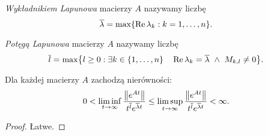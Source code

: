 %
\begin{definition}
  \emph{Wykładnikiem Lapunowa} macierzy $A$ nazywamy liczbę
  \begin{equation*}
    \overline{\lambda} = \max \{ \real \lambda_k : k = 1, \ldots, n \}.
  \end{equation*}
\end{definition}
%
\begin{definition}
  \emph{Potęgą Lapunowa} macierzy $A$ nazywamy liczbę
  \begin{equation*}
    \overline{l} = \max \bigl\{ l \geq 0 : \exists k \in \{1,\ldots,n\} \quad \real \lambda_k = \overline{\lambda} 
    \ \wedge \ M_{k,l} \not= 0 \bigr\}.
  \end{equation*}
\end{definition}
%
\begin{theorem}
  Dla każdej macierzy $A$ zachodzą nierówności:
%
  \begin{equation*}
    0 < \liminf_{t\to\infty} \frac{\norm*{e^{At}}}{t^{\overline{l}} e^{\overline{\lambda} t}} \leq
    \limsup_{t\to\infty} \frac{\norm*{e^{At}}}{t^{\overline{l}} e^{\overline{\lambda} t}} < \infty.
  \end{equation*}
\end{theorem}
%
\begin{proof}
  Łatwe.
\end{proof}
































